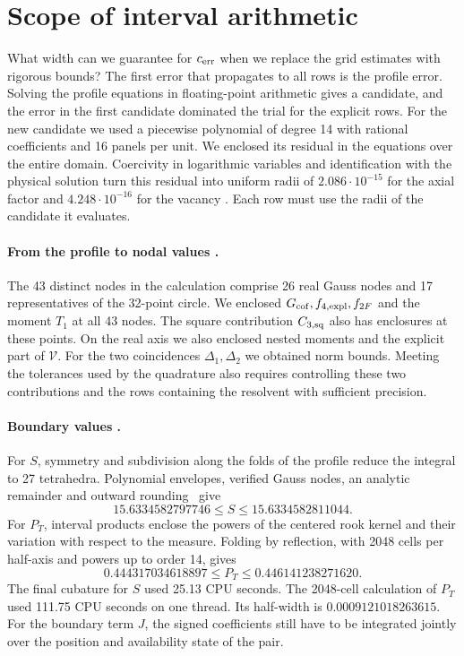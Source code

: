 \section{Scope of interval arithmetic}\label{sec:numcert}
What width can we guarantee for $c_{\mathrm{err}}$ when we replace the grid estimates with rigorous bounds?
The first error that propagates to all rows is the profile error. Solving the profile equations in
floating-point arithmetic gives a candidate, and the error in the first candidate dominated the
trial for the explicit rows. For the new candidate we used a piecewise polynomial of degree 14
with rational coefficients and 16 panels per unit. We enclosed its residual in the equations over
the entire domain. Coercivity in logarithmic variables and identification with the physical
solution turn this residual into uniform radii of $2.086\cdot10^{-15}$ for the axial factor and
$4.248\cdot10^{-16}$ for the vacancy . Each row must use the radii of the candidate it
evaluates.

\paragraph{From the profile to nodal values .}
The 43 distinct nodes in the calculation comprise 26 real Gauss nodes and 17 representatives of
the 32-point circle. We enclosed $G_{\rm cof}, f_{4,\rm expl}, f_{2F}$ and the moment $T_1$ at all
43 nodes. The square contribution $C_{3,\rm sq}$ also has enclosures at these points. On the
real axis we also enclosed nested moments and the explicit part of $\mathcal V$. For the two
coincidences $\Delta_1,\Delta_2$ we obtained norm bounds. Meeting the tolerances used by the
quadrature also requires controlling these two contributions and the rows containing the resolvent
with sufficient precision.

\paragraph{Boundary values .}\label{par:intervalos-frontera}
For $S$, symmetry and subdivision along the folds of the profile reduce the integral to 27
tetrahedra. Polynomial envelopes, verified Gauss nodes, an analytic remainder and outward
rounding~\cite{mkc,tucker} give
\[
 15.6334582797746\le S\le 15.6334582811044 .
\]
For $P_T$, interval products enclose the powers of the centered rook kernel and their variation
with respect to the measure. Folding by reflection, with 2048 cells per half-axis and powers up to
order 14, gives
\[
 0.444317034618897\le P_T\le 0.446141238271620 .
\]
The final cubature for $S$ used 25.13 CPU seconds. The 2048-cell calculation of $P_T$ used 111.75
CPU seconds on one thread. Its half-width is $0.0009121018263615$. For the boundary term $J$, the
signed coefficients still have to be integrated jointly over the position and availability state
of the pair.

